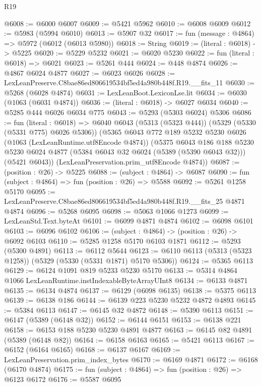 \begin{lexlean}{R19}
\begin{coremodule}
@6008 := @6000 @6007
@6009 := @5421 @5962
@6010 := @6008 @6009
@6012 := @5983 (@5994 @6010)
@6013 := @5907 @32
@6017 := fun (message : @4864) => @5972 (@6012 (@6013 @5980))
@6018 := String
@6019 := (literal : @6018) -> @5225
@6020 := @5229 @5232
@6021 := @6020 @5230
@6022 := fun (literal : @6018) => @6021
@6023 := @5261 @444
@6024 := @448 @4874
@6026 := @4867 @6024 @4877
@6027 := @6023 @6026
@6028 := LexLeanPreserve.C8bae86ed806619534bf5ed4a980b448f.R19.__fits_11
@6030 := @5268 (@6028 @4874)
@6031 := LexLeanBoot.LexiconLse.lit
@6034 := @6030 (@1063 (@6031 @4874))
@6036 := (literal : @6018) -> @6027 @6034
@6040 := @5285 @444 @6026 @6034 @775
@6043 := @5293 (@5303 @6024) @5306
@6086 := fun (literal : @6018) =>
  @6040
    @6043
    (@5313 (@5323 @444))
    (@5329 (@5330 (@5331 @775) @6026 @5306))
    (@5365
      @6043
      @772
      @189
      @5232
      @5230
      @6026
      (@1063 (LexLeanRuntime.utf8Encode @4874))
      (@5375
        @6043
        @186
        @188
        @5230
        @5230
        @6024
        @4877
        (@5384 @6043 @32 @6024 (@5389 (@5390 @6043 @32)))
        (@5421 @6043))
      (LexLeanPreservation.prim_utf8Encode @4874))
@6087 := (position : @26) -> @5225
@6088 := (subject : @4864) -> @6087
@6090 := fun (subject : @4864) => fun (position : @26) => @5588
@6092 := @5261 @1258 @5170
@6095 := LexLeanPreserve.C8bae86ed806619534bf5ed4a980b448f.R19.__fits_25 @4871 @4874
@6096 := @5268 @6095
@6098 := @5063 @1066 @1273
@6099 := LexLeanStd.Text.byteAt
@6101 := @6099 @4871 @4874
@6102 := @6098 @6101
@6103 := @6096 @6102
@6106 := (subject : @4864) -> (position : @26) -> @6092 @6103
@6110 := @5285 @1258 @5170 @6103 @1871
@6112 := @5293 (@5300 @4891)
@6113 := @6112 @5644
@6123 := @6110 @6113 (@5313 (@5323 @1258)) (@5329 (@5330 (@5331 @1871) @5170 @5306))
@6124 := @5365 @6113
@6129 := @6124 @1091 @819 @5233 @5230 @5170
@6133 := @5314 @4864 @1066 LexLeanRuntime.instIndexableByteArrayUInt8
@6134 := @6133 @4871
@6135 := @6134 @4874
@6137 := @6129 (@6098 @6135)
@6138 := @5375 @6113
@6139 := @6138 @186
@6144 := @6139 @223 @5230 @5232 @4872 @4893
@6145 := @5384 @6113
@6147 := @6145 @32 @4872
@6148 := @5390 @6113
@6151 := @6147 (@5389 (@6148 @32))
@6152 := @6144 @6151
@6153 := @6138 @221
@6158 := @6153 @188 @5230 @5230 @4891 @4877
@6163 := @6145 @82 @4891 (@5389 (@6148 @82))
@6164 := @6158 @6163
@6165 := @5421 @6113
@6167 := @6152 (@6164 @6165)
@6168 := @6137 @6167
@6169 := LexLeanPreservation.prim_index_bytes
@6170 := @6169 @4871
@6172 := @6168 (@6170 @4874)
@6175 := fun (subject : @4864) => fun (position : @26) => @6123 @6172
@6176 := @5587 @6095

\end{coremodule}
\end{lexlean}
